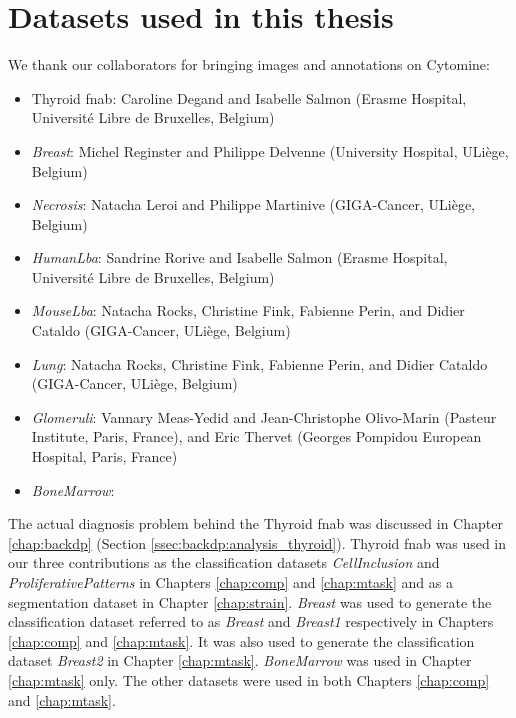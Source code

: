 \chapter{Datasets used in this thesis}
\label{app:datasets}

We thank our collaborators for bringing images and annotations on Cytomine:

\begin{itemize}
 \item Thyroid \acrshort{fnab}: Caroline Degand and Isabelle Salmon (Erasme Hospital, Universit\'e Libre de Bruxelles, Belgium)
 \item \textit{Breast}: Michel Reginster and Philippe Delvenne (University Hospital, ULi\`ege, Belgium) 
 \item \textit{Necrosis}: Natacha Leroi and Philippe Martinive (GIGA-Cancer, ULi\`ege, Belgium)
 \item \textit{HumanLba}: Sandrine Rorive and Isabelle Salmon (Erasme Hospital, Universit\'e Libre de Bruxelles, Belgium) 
 \item \textit{MouseLba}: Natacha Rocks, Christine Fink, Fabienne Perin, and Didier Cataldo (GIGA-Cancer, ULi\`ege, Belgium) 
 \item \textit{Lung}: 
Natacha Rocks, Christine Fink, Fabienne Perin, and Didier Cataldo (GIGA-Cancer, ULi\`ege, Belgium) 
 \item \textit{Glomeruli}: Vannary Meas-Yedid and Jean-Christophe Olivo-Marin (Pasteur Institute, Paris, France), and Eric Thervet (Georges Pompidou European Hospital, Paris, France)
 \item \textit{BoneMarrow}: \citeauthor{kainz2017training} \cite{kainz2017training}
\end{itemize}

The actual diagnosis problem behind the Thyroid \acrshort{fnab} was discussed in Chapter \ref{chap:backdp} (Section \ref{ssec:backdp:analysis_thyroid}). Thyroid \acrshort{fnab} was used in our three contributions as the classification datasets \textit{CellInclusion} and \textit{ProliferativePatterns} in Chapters \ref{chap:comp} and \ref{chap:mtask} and as a segmentation dataset in Chapter \ref{chap:strain}. \textit{Breast} was used to generate the classification dataset referred to as \textit{Breast} and \textit{Breast1} respectively in Chapters \ref{chap:comp} and \ref{chap:mtask}. It was also used to generate the classification dataset \textit{Breast2} in Chapter \ref{chap:mtask}. \textit{BoneMarrow} was used in Chapter \ref{chap:mtask} only. The other datasets were used in both Chapters \ref{chap:comp} and \ref{chap:mtask}.

